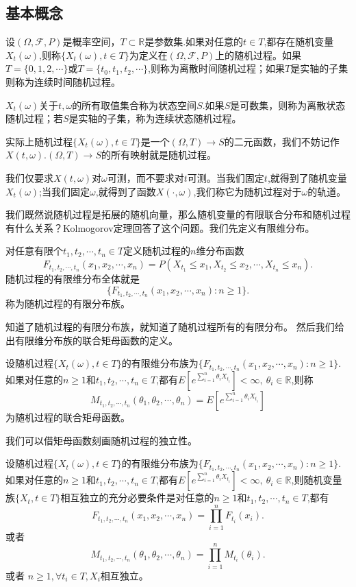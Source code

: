 \documentclass[lang=cn,10pt]{elegantbook}
\begin{document}
	\subsection{基本概念}
	\begin{definition}[随机过程]
		设\((\Omega,\mathcal{F},P)\)是概率空间，\(T\subset \mathbb{R}\)是参数集.如果对任意的\(t\in T\),都存在随机变量\(X_t(\omega)\),则称\(\{X_t(\omega),t\in T\}\)为定义在\((\Omega,\mathcal{F},P)\)上的随机过程。如果\(T=\{0,1,2,\cdots\}\)或\(T=\{t_0,t_1,t_2,\cdots\}\),则称为离散时间随机过程；如果\(T\)是实轴的子集则称为连续时间随机过程。

		\(X_t(\omega)\)关于\(t,\omega\)的所有取值集合称为状态空间\(S\).如果\(S\)是可数集，则称为离散状态随机过程；若\(S\)是实轴的子集，称为连续状态随机过程。
	\end{definition}
	\begin{note}
		实际上随机过程\(\{X_t(\omega),t\in T\}\)是一个\((\Omega,T)\to S\)的二元函数，我们不妨记作\(X(t,\omega)\).\((\Omega,T)\to S\)的所有映射就是随机过程。
		
		我们仅要求\(X(t,\omega)\)对\(\omega\)可测，而不要求对\(t\)可测。当我们固定\(t\),就得到了随机变量\(X_t(\omega)\);当我们固定\(\omega\),就得到了函数\(X(\cdot,\omega)\),我们称它为随机过程对于\(\omega\)的轨道。
	\end{note}
	我们既然说随机过程是拓展的随机向量，那么随机变量的有限联合分布和随机过程有什么关系？Kolmogorov定理回答了这个问题。我们先定义有限维分布。
	\begin{definition}[有限维分布]
		对任意有限个\(t_1,t_2,\cdots,t_n\in T\)定义随机过程的\(n\)维分布函数
		\[F_{t_1,t_2,\cdots,t_n}(x_1,x_2,\cdots,x_n)=P(X_{t_1}\le x_1,X_{t_2}\le x_2,\cdots,X_{t_n}\le x_n).\]
		随机过程的有限维分布全体就是
		\[\{F_{t_1,t_2,\cdots,t_n}(x_1,x_2,\cdots,x_n):n\ge 1\}.\]
		称为随机过程的有限分布族。
	\end{definition}
	知道了随机过程的有限分布族，就知道了随机过程所有的有限分布。
	然后我们给出有限维分布族的联合矩母函数的定义。
	\begin{definition}[联合矩母函数]
		设随机过程\(\{X_t(\omega),t\in T\}\)的有限维分布族为\(\{F_{t_1,t_2,\cdots,t_n}(x_1,x_2,\cdots,x_n):n\ge 1\}\).如果对任意的\(n\ge 1\)和\(t_1,t_2,\cdots,t_n\in T\),都有\(E[e^{\sum_{i=1}^{n}\theta_iX_{t_i}}]<\infty,\ \theta_i\in \mathbb{R}\),则称
		\[M_{t_1,t_2,\cdots,t_n}(\theta_1,\theta_2,\cdots,\theta_n)=E[e^{\sum_{i=1}^{n}\theta_iX_{t_i}}]\]
		为随机过程的联合矩母函数。
	\end{definition}
	我们可以借矩母函数刻画随机过程的独立性。
	\begin{proposition}[随机过程的独立性]
		设随机过程\(\{X_t(\omega),t\in T\}\)的有限维分布族为\(\{F_{t_1,t_2,\cdots,t_n}(x_1,x_2,\cdots,x_n):n\ge 1\}\).如果对任意的\(n\ge 1\)和\(t_1,t_2,\cdots,t_n\in T\),都有\(E[e^{\sum_{i=1}^{n}\theta_iX_{t_i}}]<\infty,\ \theta_i\in \mathbb{R}\),则随机变量族\(\{X_t,t\in T\}\)相互独立的充分必要条件是对任意的\(n\ge 1\)和\(t_1,t_2,\cdots,t_n\in T\),都有
		\[F_{t_1,t_2,\cdots,t_n}(x_1,x_2,\cdots,x_n)=\prod_{i=1}^{n}F_{t_i}(x_i).\]
		或者
		\[M_{t_1,t_2,\cdots,t_n}(\theta_1,\theta_2,\cdots,\theta_n)=\prod_{i=1}^{n}M_{t_i}(\theta_i).\]
		或者
		\(n\ge 1,\forall t_i\in T,X_i\)相互独立。
	\end{proposition}
\end{document}
